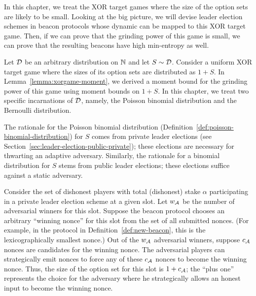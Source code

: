 
In this chapter, 
we treat the XOR target games where 
the size of the option sets are likely to be small. 
Looking at the big picture, 
we will devise leader election schemes in beacon protocols 
whose dynamic can be mapped to this XOR target game.
Then, if we can prove that the grinding power of this game is small, 
we can prove that the resulting beacons have high min-entropy as well.



Let $\mathcal{D}$ be an arbitrary distribution on $\mathbb{N}$ 
and let $S \sim \mathcal{D}$.
Consider a uniform XOR target game where 
the sizes of its option sets are distributed as $1 + S$. 
In Lemma~\ref{lemma:xorgame-moment}, 
we derived a moment bound for the grinding power of this game using moment bounds on $1 + S$. 
In this chapter, we treat two specific incarnations of $\mathcal{D}$, 
namely, the Poisson binomial distribution and 
the Bernoulli distribution.

The rationale for the Poisson binomial distribution (Definition~\ref{def:poisson-binomial-distribution}) 
for $S$ 
comes from private leader elections (see Section~\ref{sec:leader-election-public-private});
these elections are necessary for thwarting an adaptive adversary.
Similarly, the rationale for a binomial distribution for $S$ stems from 
public leader elections; 
these elections suffice against a static adversary.

Consider the set of dishonest players with total (dishonest) stake $\alpha$ 
participating 
in a private leader election scheme 
at a given slot. 
Let $w_{\mathcal{A}}$ be the number of adversarial winners for this slot.
Suppose the beacon protocol chooses an arbitrary ``winning nonce'' for this slot from the set of all submitted nonces.  
(For example, in the protocol in Definition~\ref{def:new-beacon}, this is the lexicographically smallest nonce.)
Out of the $w_{\mathcal{A}}$ adversarial winners, 
suppose $c_{\mathcal{A}}$ nonces are candidates for the winning nonce. 
The adversarial players can strategically emit nonces 
to force any of these $c_{\mathcal{A}}$ nonces to become the winning nonce.
Thus, the size of the option set for this slot is $1 + c_{\mathcal{A}}$; 
the ``plus one'' represents the choice for the adversary where 
he strategically allows an honest input to become the winning nonce. 

